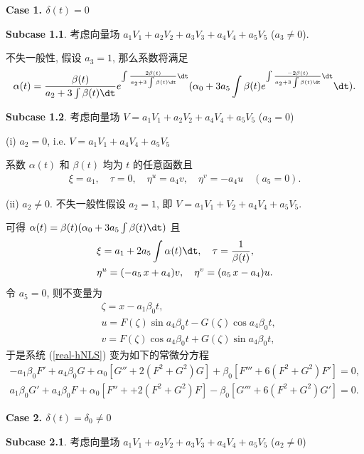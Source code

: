 \noindent \textbf{Case 1. $\delta(t)=0$}

\textbf{Subcase 1.1}. 考虑向量场 $a_1 V_1+a_2 V_2+a_3 V_3+a_4 V_4+a_5 V_5$ ($a_3\neq 0$).

不失一般性, 假设 $a_3=1$, 那么系数将满足
\begin{equation}
\alpha(t)=\frac{\beta(t)}{a_2+3\int\beta(t)\dt} e^{\int\frac{2\beta(t)}{a_2+3\int\beta(t)\dt}\dt} (\alpha_0+3a_5\int\beta(t)e^{\int\frac{-2\beta(t)}{a_2+3\int\beta(t)\dt}\dt}\dt).
\end{equation}

\textbf{Subcase 1.2}. 考虑向量场 $V=a_1 V_1+a_2 V_2+a_4 V_4+a_5 V_5$ ($a_3=0$)

(i) $a_2=0$, i.e. $V=a_1 V_1+a_4 V_4+a_5 V_5$

系数 $\alpha(t)$ 和 $\beta(t)$ 均为 $t$ 的任意函数且
\begin{align}
\xi=a_1,\quad \tau=0,\quad \eta^u=a_4v,\quad \eta^v=-a_4u \quad(a_5=0).
\end{align}

(ii) $a_2\neq0$. 不失一般性假设 $a_2=1$, 即 $V=a_1 V_1+V_2+a_4 V_4+a_5V_5$.

可得 $\alpha(t)=\beta(t)(\alpha_0+3a_5\int\beta(t)\dt)$ 且
\begin{align*}
&\xi=a_1+2a_5\int\alpha(t)\dt,\quad \tau=\frac{1}{\beta(t)},\\
&\eta^u=(-a_5\,x+a_4)v,\quad \eta^v=(a_5\,x-a_4)u.
\end{align*}
令 $a_5=0$, 则不变量为
\begin{equation}
\begin{aligned}
&\zeta=x-a_1\beta_0 t,\\
&u=F(\zeta)\sin{a_4\beta_0t}-G(\zeta)\cos{a_4\beta_0t},\\
&v=F(\zeta)\cos{a_4\beta_0t}+G(\zeta)\sin{a_4\beta_0t},
\end{aligned}
\end{equation}
于是系统 (\ref{real-hNLS}) 变为如下的常微分方程
\begin{equation}
\begin{aligned}
-a_1\beta_0F'+a_4\beta_0G+\alpha_0[G''+2(F^2+G^2)G]+\beta_0[F'''+6(F^2+G^2)F']=0,\\
a_1\beta_0G'+a_4\beta_0F+\alpha_0[F''++2(F^2+G^2)F]-\beta_0[G'''+6(F^2+G^2)G']=0.
\end{aligned}
\end{equation}


\noindent \textbf{Case 2. $\delta(t)=\delta_0\neq0$}

\textbf{Subcase 2.1}. 考虑向量场 $a_1 V_1+a_2 V_2+a_3 V_3+a_4 V_4+a_5 V_5$ ($a_2\neq 0$)

